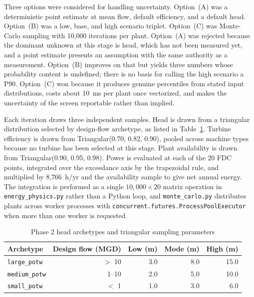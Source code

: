 \documentclass[12pt,letterpaper]{report}
\begin{document}
Three options were considered for handling uncertainty. Option~(A) was a
deterministic point estimate at mean flow, default efficiency, and a default
head. Option~(B) was a low, base, and high scenario triplet. Option~(C) was
Monte-Carlo sampling with 10{,}000 iterations per plant. Option~(A) was rejected
because the dominant unknown at this stage is head, which has not been measured
yet, and a point estimate presents an assumption with the same authority as a
measurement. Option~(B) improves on that but yields three numbers whose
probability content is undefined; there is no basis for calling the high
scenario a P90. Option~(C) won because it produces genuine percentiles from
stated input distributions, costs about 10~ms per plant once vectorized, and
makes the uncertainty of the screen reportable rather than implied.

Each iteration draws three independent samples. Head is drawn from a triangular
distribution selected by design-flow archetype, as listed in
Table~\ref{tab:head_archetypes}. Turbine efficiency is drawn from
Triangular(0.70, 0.82, 0.90), pooled across machine types because no turbine has
been selected at this stage. Plant availability is drawn from Triangular(0.90,
0.95, 0.98). Power is evaluated at each of the 20 FDC points, integrated over the
exceedance axis by the trapezoidal rule, and multiplied by 8{,}766~h/yr and the
availability sample to give net annual energy. The integration is performed as a
single $10{,}000 \times 20$ matrix operation in \texttt{energy\_physics.py}
rather than a Python loop, and \texttt{monte\_carlo.py} distributes plants across
worker processes with \texttt{concurrent.\allowbreak futures.\allowbreak ProcessPoolExecutor} when more
than one worker is requested.

\begin{table}[htbp]
\centering
\caption{Phase 2 head archetypes and triangular sampling parameters}
\label{tab:head_archetypes}
\begin{tabular}{lrrrr}
\toprule
Archetype & Design flow (MGD) & Low (m) & Mode (m) & High (m) \\
\midrule
\texttt{large\_potw}  & $>$ 10      & 3.0 & 8.0 & 15.0 \\
\texttt{medium\_potw} & 1--10       & 2.0 & 5.0 & 10.0 \\
\texttt{small\_potw}  & $<$ 1       & 1.0 & 3.0 & 6.0 \\
\bottomrule
\end{tabular}
\end{table}
\end{document}
